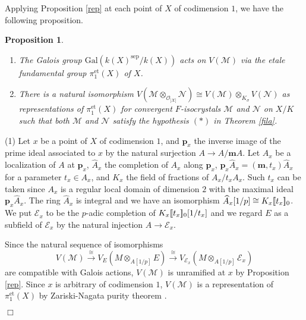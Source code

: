 \documentclass[11pt]{amsart}
\newtheorem{proposition}[Lemma]{Proposition}
\begin{document}
Applying Proposition \ref{rep} at each point of $X$ of codimension $1$, we have 
the following proposition. 

\begin{proposition}\label{unr} 
\begin{enumerate}
\item The Galois group $\mathrm{Gal}(k(X)^{\mathrm{sep}}/k(X))$ 
acts on $V(\mathcal M)$ via the etale fundamental group 
$\pi_1^{\mathrm{et}}(X)$ of $X$. 
\item There is a natural isomorphism $V(\mathcal M\otimes_{\mathcal O_{]X[}}\mathcal N) \cong 
V(\mathcal M) \otimes_{K_\sigma} V(\mathcal N)$ as representations of $\pi_1^{\mathrm{et}}(X)$ 
for convergent $F$-isocrystals $\mathcal M$ and $\mathcal N$ on $X/K$ 
such that both $\mathcal M$ and $\mathcal N$ satisfy the hypothesis $(\ast)$ in Theorem \ref{fila}. 
\end{enumerate}
\end{proposition}

{ {(1) Let $x$ be a point of $X$ of codimension $1$, and $\mathbf p_x$ the inverse image 
of the prime ideal associated to $x$ by the natural surjection $A \rightarrow A/\mathbf mA$. 
Let $A_x$ be a localization of $A$ at $\mathbf p_x$, $\widehat{A}_x$ the completion of $A_x$ along $\mathbf p_x$, 
$\mathbf p_x\widehat{A}_x = (\mathbf m, t_x)\widehat{A}_x$ for a parameter $t_x \in A_x$, 
and $K_x$ the field of fractions of $A_x/t_xA_x$. 
Such $t_x$ can be taken since $A_x$ is a regular local domain of dimension $2$ 
with the maximal ideal $\mathbf p_x\widehat{A}_x$. 
The ring $\widehat{A}_x$ is integral and we have an isomorphism 
$\widehat{A}_x[1/p] \cong K_x[\hspace*{-0.6mm}[t_x]\hspace*{-0.6mm}]_0$. 
We put $\mathcal E_x$ to be the $p$-adic completion of $K_x[\hspace*{-0.6mm}[t_x]\hspace*{-0.6mm}]_0[1/t_x]$ 
and we regard $E$ as a subfield of $\mathcal E_x$ by the natural injection 
$A \rightarrow \mathcal E_x$. 

Since the natural sequence of isomorphisms 
$$
  V(\mathcal M) \overset{\cong}{\rightarrow} V_E(M \otimes_{A[1/p]} E) 
    \overset{\cong}{\rightarrow}  V_{\mathcal E_x}(M \otimes_{A[1/p]} \mathcal E_x) 
$$
are compatible with Galois actions, $V(\mathcal M)$ is unramified at $x$ 
by Proposition \ref{rep}. Since $x$ is arbitrary of codimension $1$, 
$V(\mathcal M)$ is a representation of $\pi_1^{\mathrm{et}}(X)$ by Zariski-Nagata purity theorem 
\cite[X, Theorem 3.4]{SGA2}. 
} \hspace*{\fill} $\Box$}
\end{document}
